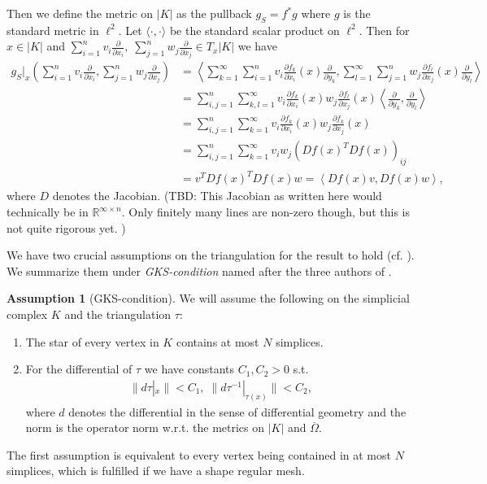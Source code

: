 \documentclass[12pt,a4paper]{article}
\theoremstyle{definition}
\newtheorem{assumption}{Assumption}
\newcommand{\omegabar}{\overline{\Omega}}
\newcommand{\real}{\mathbb{R}}
\begin{document}
Then we define the metric on $|K|$ as the pullback $g_S = f^*g$ 
where $g$ is the standard metric in $\ell^2$. Let $\langle \cdot , 
\cdot \rangle$ be the standard scalar product on $\ell^2$. Then for $x \in |K|$ 
and $\sum_{i=1}^n v_i \frac{\partial}{\partial x_i}, \; 
\sum_{j=1}^n w_j \frac{\partial}{\partial x_j} \in T_x |K|$ we have 
\begin{align*}
g_S|_x\left(\sum_{i=1}^n v_i \frac{\partial}{\partial x_i}, 
\sum_{j=1}^n w_j \frac{\partial}{\partial x_j}\right) &= 
\left\langle \sum_{k=1}^\infty \sum_{i=1}^n v_i 
\frac{\partial f_k}{\partial x_i} (x)
\frac{\partial }{\partial y_k}, 
\sum_{l=1}^\infty \sum_{j=1}^n w_j \frac{\partial f_l}{\partial x_j} (x)
\frac{\partial }{\partial y_l} \right\rangle \\   
&= \sum_{i,j=1}^n \sum_{k,l=1}^\infty v_i \frac{\partial f_k}{\partial x_i} (x)
w_j \frac{\partial f_l}{\partial x_j} (x) 
\left\langle \frac{\partial }{\partial y_k}, \frac{\partial }{\partial y_l} 
\right\rangle\\
&= \sum_{i,j=1}^n \sum_{k=1}^\infty v_i \frac{\partial f_k}{\partial x_i} (x)
w_j \frac{\partial f_k}{\partial x_j} (x)\\
&= \sum_{i,j=1}^n \sum_{k=1}^\infty v_i w_j \left( Df(x)^T Df(x) \right)_{ij} \\
&= v^T Df(x)^T Df(x) w = \left\langle Df(x) v, Df(x) w \right\rangle,
\end{align*}
where $D$ denotes the Jacobian. 
{\color{red} (TBD: This Jacobian as written here would technically be in 
$\real^{\infty \times n}$. Only finitely many lines are non-zero though, 
but this is not quite rigorous yet. )}

We have two crucial assumptions on the triangulation for the result to hold 
(cf. \cite[p.194]{goldshtein}). We summarize them under 
\textit{GKS-condition} named after the three authors of \cite{goldshtein}.

\begin{assumption}[GKS-condition]
    We will assume the following on the simplicial complex $K$ 
    and the triangulation $\tau$:
    \begin{enumerate}
    \item The star of every vertex in $K$ contains at most $N$ simplices.
    \item For the differential of $\tau$ we have constants 
        $C_1, C_2 > 0$ s.t.
        \begin{align*}
        \lVert d\tau|_x \rVert < C_1, \; 
        \lVert d\tau^{-1}|_{\tau(x)} \rVert < C_2,
        \end{align*}
        where $d$ denotes the differential in the sense of differential 
        geometry and the norm is the operator norm w.r.t. the metrics on $|K|$ 
        and $\omegabar$.
    \end{enumerate}
\end{assumption}
The first assumption is equivalent to every vertex being contained in
at most $N$ simplices, which is fulfilled if we have a shape regular mesh.\par
\end{document}
